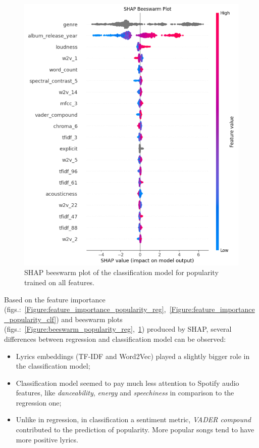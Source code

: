 \begin{center}
\begin{figure}[H]
  \centering
  \includegraphics[width=6in]{img/beeswarm_popularity_clf.png}
  \caption{SHAP beeswarm plot of the classification model for popularity trained on all features.}
  \label{Figure:beeswarm_popularity_clf}
\end{figure}
\end{center}


Based on the feature importance
(figs.:~\ref{Figure:feature_importance_popularity_reg},~\ref{Figure:feature_importance_popularity_clf})
and beeswarm plots
(figs.:~\ref{Figure:beeswarm_popularity_reg},~\ref{Figure:beeswarm_popularity_clf})
produced by SHAP, several differences between regression and classification
model can be observed:
\begin{itemize}
  \item Lyrics embeddings (TF-IDF and Word2Vec) played a slightly bigger role in
    the classification model;
  \item Classification model seemed to pay much less attention to Spotify audio
    features, like \textit{danceability}, \textit{energy} and
    \textit{speechiness} in comparison to the regression one;
  \item Unlike in regression, in classification a sentiment metric,
    \textit{VADER compound} contributed to the prediction of popularity. More
    popular songs tend to have more positive lyrics.
\end{itemize}



